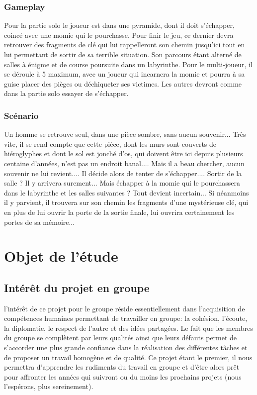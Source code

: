 \documentclass[12pt,a4paper]{article}
\begin{document}
\subsubsection{Gameplay}
Pour la partie solo le joueur est dans une pyramide, dont il doit s'échapper, coincé avec une momie qui le pourchasse. Pour finir le jeu, ce dernier devra retrouver des fragments de clé qui lui rappelleront son chemin jusqu'ici tout en lui permettant de sortir de sa terrible situation. Son parcours étant alterné de salles à énigme et de course poursuite dans un labyrinthe.
Pour le multi-joueur, il se déroule à 5 maximum, avec un joueur qui incarnera la momie et pourra à sa guise placer des pièges ou déchiqueter ses victimes.
Les autres devront comme dans la partie solo essayer de s'échapper.
\subsubsection{Scénario}
Un homme se retrouve seul, dans une pièce sombre, sans aucun souvenir...
Très vite, il se rend compte que cette pièce, dont les murs sont couverts de hiéroglyphes et dont le sol est jonché d'os, qui doivent être ici depuis plusieurs centaine d'années, n'est pas un endroit banal....
Mais il a beau chercher, aucun souvenir ne lui revient....
Il décide alors de tenter de s'échapper....
Sortir de la salle ? Il y arrivera surement... Mais échapper à la momie qui le pourchassera dans le labyrinthe et les salles suivantes ? Tout devient incertain...
Si néanmoins il y parvient, il trouvera sur son chemin les fragments d'une mystérieuse clé, qui en plus de lui ouvrir la porte de la sortie finale, lui ouvrira certainement les portes de sa mémoire...

\newpage
\section{Objet de l'étude}
\subsection{Intérêt du projet en groupe}
l'intérêt de ce projet pour le groupe réside essentiellement dans l'acquisition de compétences humaines
permettant de travailler en groupe: la cohésion, l'écoute, la diplomatie, le respect de l'autre et des idées partagées.
Le fait que les membres du groupe se complètent par leurs qualités ainsi que leurs défauts permet de s'accorder une plus grande confiance dans la réalisation des différentes tâches et de proposer un travail
homogène et de qualité.
Ce projet étant le premier, il nous permettra d'apprendre les rudiments du travail en groupe et d'être
alors prêt pour affronter les années qui suivront ou du moins les
prochains projets (nous l'espérons, plus sereinement).
\end{document}
